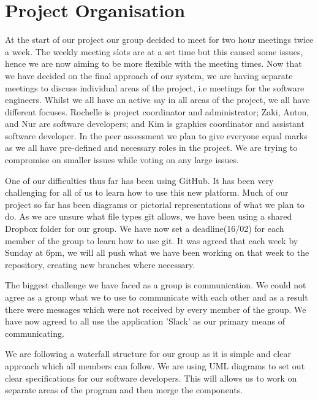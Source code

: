 \documentclass[11pt]{article}
\begin{document}
	\section{Project Organisation}
		At the start of our project our group decided to meet for two hour meetings twice a week. The weekly meeting slots are at a set time but this caused some issues, hence we are now aiming to be more flexible with the meeting times. Now that we have decided on the final approach of our system, we are having separate meetings to discuss individual areas of the project, i.e meetings for the software engineers. Whilst we all have an active say in all areas of the project, we all have different focuses. Rochelle is project coordinator and administrator; Zaki, Anton, and Nur are software developers; and Kim is graphics coordinator and assistant software developer. In the peer assessment we plan to give everyone equal marks as we all have pre-defined and necessary roles in the project. We are trying to compromise on smaller issues while voting on any large issues. 
		 
		One of our difficulties thus far has been using GitHub. It has been very challenging for all of us to learn how to use this new platform.  Much of our project so far has been diagrams or pictorial representations of what we plan to do. As we are unsure what file types git allows, we have been using a shared Dropbox folder for our group. We have now set a deadline(16/02) for each member of the group to learn how to use git. It was agreed that each week by Sunday at 6pm, we will all push what we have been working on that week to the repository, creating new branches where necessary. 
		
		The biggest challenge we have faced as a group is communication. We could not agree as a group what we to use to communicate with each other and as a result there were messages which were not received by every member of the group. We have now agreed to all use the application 'Slack' as our primary means of communicating. 
		
		We are following a waterfall structure for our group as it is simple and clear approach which all members can follow. We are using UML diagrams to set out clear specifications for our software developers. This will allows us to work on separate areas of the program and then merge the components.  
	
\end{document}
